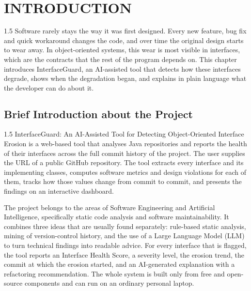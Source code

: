 \documentclass[12pt,a4paper]{article}
\begin{document}
\section{INTRODUCTION}

\begin{spacing}{1.5}
\justifying
Software rarely stays the way it was first designed. Every new feature,
bug fix and quick workaround changes the code, and over time the original
design starts to wear away. In object-oriented systems, this wear is most
visible in interfaces, which are the contracts that the rest of the program
depends on. This chapter introduces InterfaceGuard, an AI-assisted tool
that detects how these interfaces degrade, shows when the degradation
began, and explains in plain language what the developer can do about it.
\end{spacing}

\subsection{Brief Introduction about the Project}

\begin{spacing}{1.5}
\justifying
InterfaceGuard: An AI-Assisted Tool for Detecting Object-Oriented Interface
Erosion is a web-based tool that analyses Java repositories and reports the
health of their interfaces across the full commit history of the project.
The user supplies the URL of a public GitHub repository. The tool extracts
every interface and its implementing classes, computes software metrics and
design violations for each of them, tracks how those values change from
commit to commit, and presents the findings on an interactive dashboard.

The project belongs to the areas of Software Engineering and Artificial
Intelligence, specifically static code analysis and software maintainability.
It combines three ideas that are usually found separately: rule-based static
analysis, mining of version-control history, and the use of a Large Language
Model (LLM) to turn technical findings into readable advice. For every
interface that is flagged, the tool reports an Interface Health Score, a
severity level, the erosion trend, the commit at which the erosion started,
and an AI-generated explanation with a refactoring recommendation. The
whole system is built only from free and open-source components and can
run on an ordinary personal laptop.
\end{spacing}
\end{document}
